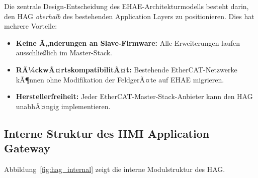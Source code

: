 ﻿\documentclass[12pt,a4paper]{article}
\begin{document}
Die zentrale Design-Entscheidung des EHAE-Architekturmodells besteht darin, den HAG
\emph{oberhalb} des bestehenden Application Layers zu positionieren. Dies hat mehrere
Vorteile:

\begin{itemize}[leftmargin=2em]
  \item \textbf{Keine Ã„nderungen an Slave-Firmware:} Alle Erweiterungen laufen
    ausschlie\ss{}lich im Master-Stack.
  \item \textbf{RÃ¼ckwÃ¤rtskompatibilitÃ¤t:} Bestehende EtherCAT-Netzwerke kÃ¶nnen ohne
    Modifikation der FeldgerÃ¤te auf EHAE migrieren.
  \item \textbf{Herstellerfreiheit:} Jeder EtherCAT-Master-Stack-Anbieter kann den HAG
    unabhÃ¤ngig implementieren.
\end{itemize}

\subsection{Interne Struktur des HMI Application Gateway}

Abbildung~\ref{fig:hag_internal} zeigt die interne Modulstruktur des HAG.
\end{document}
